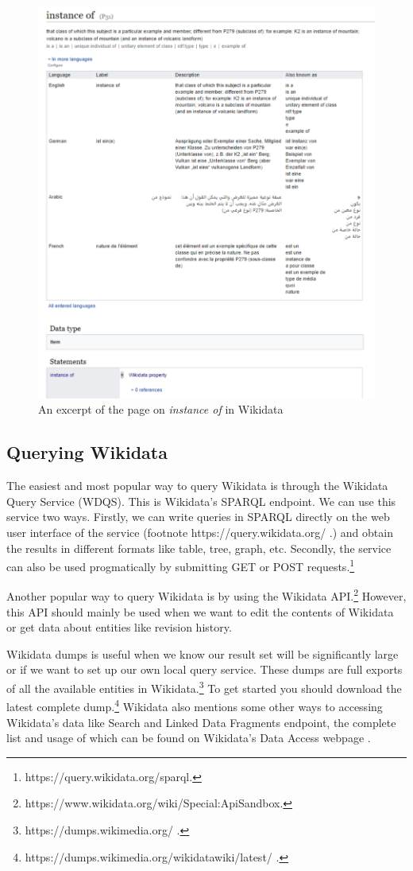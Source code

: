 \begin{figure}[h]
  \centering
  \includegraphics[width=0.75 \linewidth]{images/instance_of.pdf}
  \caption{An excerpt of the page on \textit{instance of} in Wikidata}
  \label{fig:figure 5}
\end{figure}

\subsection{Querying Wikidata}

The easiest and most popular way to query Wikidata is through the Wikidata Query Service (WDQS). This is Wikidata's SPARQL endpoint. We can use this service two ways. Firstly, we can write queries in SPARQL directly on the web user interface of the service (footnote https://query.wikidata.org/ .) and obtain the results in different formats like table, tree, graph, etc. Secondly, the service can also be used progmatically by submitting GET or POST requests.\footnote{https://query.wikidata.org/sparql.}

Another popular way to query Wikidata is by using the Wikidata API.\footnote{https://www.wikidata.org/wiki/Special:ApiSandbox.} However, this API should mainly be used when we want to edit the contents of Wikidata or get data about entities like revision history.

Wikidata dumps is useful when we know our result set will be significantly large or if we want to set up our own local query service. These dumps are full exports of all the available entities in Wikidata.\footnote{https://dumps.wikimedia.org/ .} To get started you should download the latest complete dump.\footnote{https://dumps.wikimedia.org/wikidatawiki/latest/ .} Wikidata also mentions some other ways to accessing Wikidata's data like Search and Linked Data Fragments endpoint, the complete list and usage of which can be found on Wikidata's Data Access webpage \cite{ Wikidata2022}.


